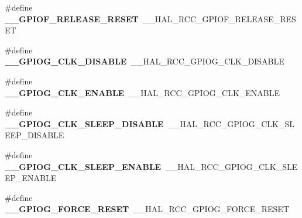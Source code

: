 \begin{DoxyCompactItemize}
\item 
\#define {\bfseries \+\_\+\+\_\+\+G\+P\+I\+O\+F\+\_\+\+R\+E\+L\+E\+A\+S\+E\+\_\+\+R\+E\+S\+ET}~\+\_\+\+\_\+\+H\+A\+L\+\_\+\+R\+C\+C\+\_\+\+G\+P\+I\+O\+F\+\_\+\+R\+E\+L\+E\+A\+S\+E\+\_\+\+R\+E\+S\+ET\hypertarget{group___h_a_l___r_c_c___aliased_gad98def6c53d7028877c2f34e16de5b89}{}\label{group___h_a_l___r_c_c___aliased_gad98def6c53d7028877c2f34e16de5b89}

\item 
\#define {\bfseries \+\_\+\+\_\+\+G\+P\+I\+O\+G\+\_\+\+C\+L\+K\+\_\+\+D\+I\+S\+A\+B\+LE}~\+\_\+\+\_\+\+H\+A\+L\+\_\+\+R\+C\+C\+\_\+\+G\+P\+I\+O\+G\+\_\+\+C\+L\+K\+\_\+\+D\+I\+S\+A\+B\+LE\hypertarget{group___h_a_l___r_c_c___aliased_ga92dbcb4535f920a5491868e11679317d}{}\label{group___h_a_l___r_c_c___aliased_ga92dbcb4535f920a5491868e11679317d}

\item 
\#define {\bfseries \+\_\+\+\_\+\+G\+P\+I\+O\+G\+\_\+\+C\+L\+K\+\_\+\+E\+N\+A\+B\+LE}~\+\_\+\+\_\+\+H\+A\+L\+\_\+\+R\+C\+C\+\_\+\+G\+P\+I\+O\+G\+\_\+\+C\+L\+K\+\_\+\+E\+N\+A\+B\+LE\hypertarget{group___h_a_l___r_c_c___aliased_gae2ca1f890479936f0af6c7babf081333}{}\label{group___h_a_l___r_c_c___aliased_gae2ca1f890479936f0af6c7babf081333}

\item 
\#define {\bfseries \+\_\+\+\_\+\+G\+P\+I\+O\+G\+\_\+\+C\+L\+K\+\_\+\+S\+L\+E\+E\+P\+\_\+\+D\+I\+S\+A\+B\+LE}~\+\_\+\+\_\+\+H\+A\+L\+\_\+\+R\+C\+C\+\_\+\+G\+P\+I\+O\+G\+\_\+\+C\+L\+K\+\_\+\+S\+L\+E\+E\+P\+\_\+\+D\+I\+S\+A\+B\+LE\hypertarget{group___h_a_l___r_c_c___aliased_gacf397da76245acbf054ecef32284bdfc}{}\label{group___h_a_l___r_c_c___aliased_gacf397da76245acbf054ecef32284bdfc}

\item 
\#define {\bfseries \+\_\+\+\_\+\+G\+P\+I\+O\+G\+\_\+\+C\+L\+K\+\_\+\+S\+L\+E\+E\+P\+\_\+\+E\+N\+A\+B\+LE}~\+\_\+\+\_\+\+H\+A\+L\+\_\+\+R\+C\+C\+\_\+\+G\+P\+I\+O\+G\+\_\+\+C\+L\+K\+\_\+\+S\+L\+E\+E\+P\+\_\+\+E\+N\+A\+B\+LE\hypertarget{group___h_a_l___r_c_c___aliased_gab096e874f34cac1a17f8304b352145fb}{}\label{group___h_a_l___r_c_c___aliased_gab096e874f34cac1a17f8304b352145fb}

\item 
\#define {\bfseries \+\_\+\+\_\+\+G\+P\+I\+O\+G\+\_\+\+F\+O\+R\+C\+E\+\_\+\+R\+E\+S\+ET}~\+\_\+\+\_\+\+H\+A\+L\+\_\+\+R\+C\+C\+\_\+\+G\+P\+I\+O\+G\+\_\+\+F\+O\+R\+C\+E\+\_\+\+R\+E\+S\+ET\hypertarget{group___h_a_l___r_c_c___aliased_ga57b6cddde29aedce9ebf483960f1791b}{}\label{group___h_a_l___r_c_c___aliased_ga57b6cddde29aedce9ebf483960f1791b}


\end{DoxyCompactItemize}
